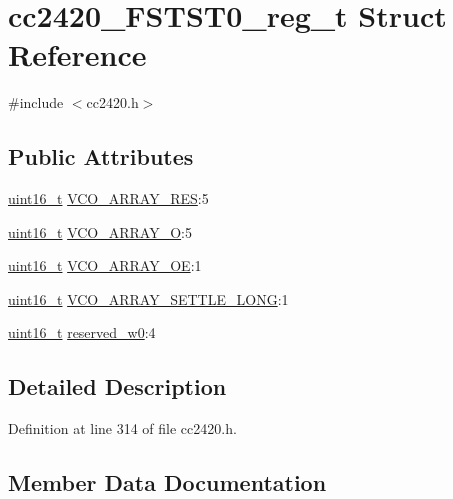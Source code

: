 \hypertarget{structcc2420___f_s_t_s_t0__reg__t}{}\section{cc2420\+\_\+\+F\+S\+T\+S\+T0\+\_\+reg\+\_\+t Struct Reference}
\label{structcc2420___f_s_t_s_t0__reg__t}


{\ttfamily \#include $<$cc2420.\+h$>$}

\subsection*{Public Attributes}
\begin{DoxyCompactItemize}
\item 
\hyperlink{_p_e___types_8h_a1f1825b69244eb3ad2c7165ddc99c956}{uint16\+\_\+t} \hyperlink{structcc2420___f_s_t_s_t0__reg__t_a8eece237a1b041204026f039a0f1af67}{V\+C\+O\+\_\+\+A\+R\+R\+A\+Y\+\_\+\+R\+ES}\+:5
\item 
\hyperlink{_p_e___types_8h_a1f1825b69244eb3ad2c7165ddc99c956}{uint16\+\_\+t} \hyperlink{structcc2420___f_s_t_s_t0__reg__t_a196e67993a1bdb37dcef69338e72223b}{V\+C\+O\+\_\+\+A\+R\+R\+A\+Y\+\_\+O}\+:5
\item 
\hyperlink{_p_e___types_8h_a1f1825b69244eb3ad2c7165ddc99c956}{uint16\+\_\+t} \hyperlink{structcc2420___f_s_t_s_t0__reg__t_ae038a4b07e607f218fd13c9ea9a8c5e4}{V\+C\+O\+\_\+\+A\+R\+R\+A\+Y\+\_\+\+OE}\+:1
\item 
\hyperlink{_p_e___types_8h_a1f1825b69244eb3ad2c7165ddc99c956}{uint16\+\_\+t} \hyperlink{structcc2420___f_s_t_s_t0__reg__t_ac264f08517533ef185f044e72322acb7}{V\+C\+O\+\_\+\+A\+R\+R\+A\+Y\+\_\+\+S\+E\+T\+T\+L\+E\+\_\+\+L\+O\+NG}\+:1
\item 
\hyperlink{_p_e___types_8h_a1f1825b69244eb3ad2c7165ddc99c956}{uint16\+\_\+t} \hyperlink{structcc2420___f_s_t_s_t0__reg__t_a80409084b80f564b673d45e947146941}{reserved\+\_\+w0}\+:4
\end{DoxyCompactItemize}


\subsection{Detailed Description}


Definition at line 314 of file cc2420.\+h.



\subsection{Member Data Documentation}
